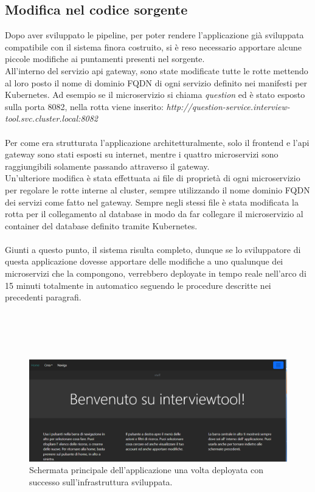 \documentclass[a4paper,12pt]{report}
\begin{document}
\subsection{Modifica nel codice sorgente}
Dopo aver sviluppato le pipeline, per poter rendere l'applicazione già sviluppata compatibile con il sistema finora costruito, si è reso necessario apportare alcune piccole modifiche ai puntamenti presenti nel sorgente.\\
All'interno del servizio api gateway, sono state modificate tutte le rotte mettendo al loro posto il nome di dominio FQDN di ogni servizio definito nei manifesti per Kubernetes. Ad esempio se il microservizio si chiama \textit{question} ed è stato esposto sulla porta 8082, nella rotta viene inserito: \textit{http://question-service.interview-tool.svc.cluster.local:8082}\\ \\
Per come era strutturata l'applicazione architetturalmente, solo il frontend e l'api gateway sono stati esposti su internet, mentre i quattro microservizi sono raggiungibili solamente passando attraverso il gateway.\\ 
Un'ulteriore modifica è stata effettuata ai file di proprietà di ogni microservizio per regolare le rotte interne al cluster, sempre utilizzando il nome dominio FQDN dei servizi come fatto nel gateway. Sempre negli stessi file è stata modificata la rotta per il collegamento al database in modo da far collegare il microservizio al container del database definito tramite Kubernetes.\\ \\
Giunti a questo punto, il sistema risulta completo, dunque se lo sviluppatore di questa applicazione dovesse apportare delle modifiche a uno qualunque dei microservizi che la compongono, verrebbero deployate in tempo reale nell'arco di 15 minuti totalmente in automatico seguendo le procedure descritte nei precedenti paragrafi. \\ \\ \\ \\ \\ 


\begin{figure}[h]
	\includegraphics[width=1.0\textwidth]{app_micro}
    \caption{Schermata principale dell'applicazione una volta deployata con successo sull'infrastruttura sviluppata.}
    \label{fig:app_micro}
\end{figure}
\end{document}
